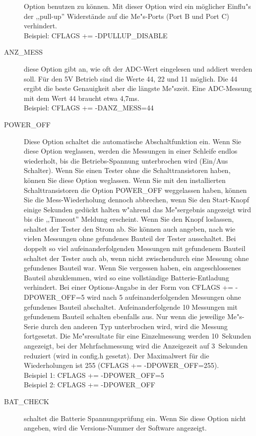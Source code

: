 \begin{description}
Option benutzen zu k\"onnen.
Mit dieser Option wird ein m\"oglicher Einflu"s der ,,pull-up'' Widerst\"ande auf die Me"s-Ports (Port B und Port C) verhindert.\\
Beispiel: CFLAGS += -DPULLUP\_DISABLE
  \item[ANZ\_MESS] diese Option gibt an, wie oft der ADC-Wert eingelesen und addiert werden soll.
F\"ur den 5V Betrieb sind die Werte 44, 22 und 11 m\"oglich. Die 44 ergibt die beste Genauigkeit aber die l\"angste Me"szeit.
Eine ADC-Messung mit dem Wert 44 braucht etwa 4,7ms.\\
Beispiel: CFLAGS += -DANZ\_MESS=44
  \item[POWER\_OFF] Diese Option schaltet die automatische Abschaltfunktion ein.
Wenn Sie diese Option weglassen, werden die Messungen in einer Schleife endlos wiederholt, bis die Betriebs-Spannung 
unterbrochen wird (Ein/Aus Schalter).
Wenn Sie einen Tester ohne die Schalttransistoren haben, k\"onnen Sie diese Option weglassen.
Wenn Sie mit den installierten Schalttransistoren die Option POWER\_OFF weggelassen haben,
k\"onnen Sie die Mess-Wiederholung dennoch abbrechen, wenn Sie den Start-Knopf einige Sekunden ged\"uckt halten 
w"ahrend das Me"sergebnis angezeigt wird bis die ,,Timeout'' Meldung erscheint.
Wenn Sie den Knopf loslassen, schaltet der Tester den Strom ab.
Sie k\"onnen auch angeben, nach wie vielen Messungen ohne gefundenes Bauteil der Tester ausschaltet.
Bei doppelt so viel aufeinanderfolgenden Messungen mit gefundenem Bauteil schaltet der Tester auch ab,
wenn nicht zwischendurch eine Messung ohne gefundenes Bauteil war.
Wenn Sie vergessen haben, ein angeschlossenes Bauteil abzuklemmen, wird so eine vollst\"andige Batterie-Entladung
verhindert.
Bei einer Options-Angabe in der Form von CFLAGS += -DPOWER\_OFF=5 wird nach 5 aufeinanderfolgenden Messungen ohne
gefundenes Bauteil abschaltet. Aufeinanderfolgende 10 Messungen mit gefundenem Bauteil schalten ebenfalls aus.
Nur wenn die jeweilige Me"s-Serie durch den anderen Typ unterbrochen wird, wird die Messung fortgesetzt.
Die Me"sresultate f\"ur eine Einzelmessung werden 10~Sekunden angezeigt, bei der Mehrfachmessung wird die
Anzeigezeit auf 3~Sekunden reduziert (wird in config.h gesetzt).
Der Maximalwert f\"ur die Wiederholungen ist 255 (CFLAGS += -DPOWER\_OFF=255).\\
Beispiel 1: CFLAGS += -DPOWER\_OFF=5 \\
Beispiel 2: CFLAGS += -DPOWER\_OFF 
  \item[BAT\_CHECK] schaltet die Batterie Spannungspr\"ufung ein.
 Wenn Sie diese Option nicht angeben, wird die Versions-Nummer der Software angezeigt.

\end{description}

